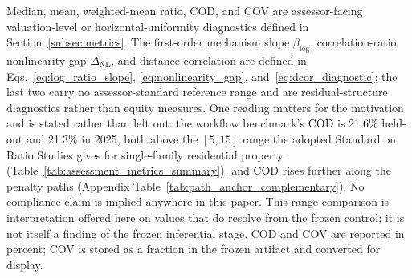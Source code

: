 \documentclass[10pt]{article}
\theoremstyle{definition}
\newcommand{\1}{\mathbf{1}}
\begin{document}
\begin{table}[!htbp]
\begin{minipage}{\textwidth}
Median, mean, weighted-mean ratio, COD, and COV are assessor-facing valuation-level or horizontal-uniformity diagnostics defined in Section~\ref{subsec:metrics}. The first-order mechanism slope $\beta_{\log}$, correlation-ratio nonlinearity gap $\Delta_{\mathrm{NL}}$, and distance correlation are defined in Eqs.~\eqref{eq:log_ratio_slope}, \eqref{eq:nonlinearity_gap}, and~\eqref{eq:dcor_diagnostic}; the last two carry no assessor-standard reference range and are residual-structure diagnostics rather than equity measures.
One reading matters for the motivation and is stated rather than left out: the workflow benchmark's COD is 21.6\% held-out and 21.3\% in 2025, both above the $[5,15]$ range the adopted Standard on Ratio Studies gives for single-family residential property (Table~\ref{tab:assessment_metrics_summary}), and COD rises further along the penalty paths (Appendix Table~\ref{tab:path_anchor_complementary}). No compliance claim is implied anywhere in this paper. This range comparison is interpretation offered here on values that do resolve from the frozen control; it is not itself a finding of the frozen inferential stage.
COD and COV are reported in percent; COV is stored as a fraction in the frozen artifact and converted for display.
\end{minipage}
\end{table}
\end{document}
